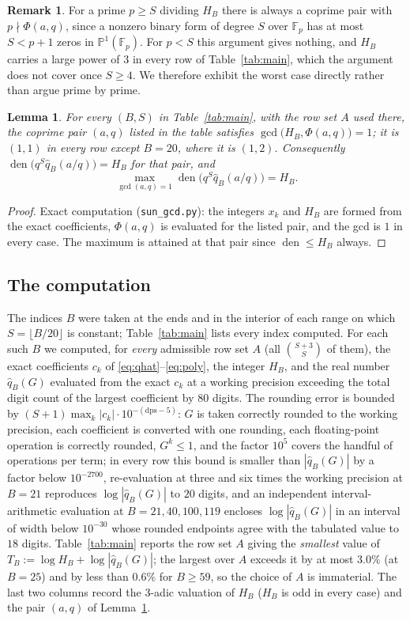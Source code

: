 \documentclass[11pt]{amsart}
\newtheorem{lemma}[theorem]{Lemma}
\theoremstyle{definition}
\newtheorem{remark}[theorem]{Remark}
\newcommand{\Fp}{\mathbb{F}_p}
\newcommand{\qhat}{\widehat{q}}
\DeclareMathOperator{\den}{den}
\begin{document}
\begin{remark}
For a prime $p\ge S$ dividing $H_B$ there is always a coprime pair with $p\nmid\Phi(a,q)$, since a nonzero binary
form of degree $S$ over $\Fp$ has at most $S<p+1$ zeros in $\mathbb P^1(\Fp)$. For $p<S$ this argument gives nothing, and $H_B$ carries a large power of $3$ in every row of Table~\ref{tab:main}, which the argument does not cover once $S\ge4$. We therefore exhibit the
worst case directly rather than argue prime by prime.
\end{remark}

\begin{lemma}\label{lem:cert}
For every $(B,S)$ in Table~\ref{tab:main}, with the row set $A$ used there, the coprime pair $(a,q)$ listed in the table satisfies $\gcd\bigl(H_B,\Phi(a,q)\bigr)=1$; it is $(1,1)$ in every row except $B=20$, where it is $(1,2)$. Consequently $\den\bigl(q^S\qhat_B(a/q)\bigr)=H_B$ for that pair, and
\[
\max_{\gcd(a,q)=1}\den\bigl(q^S\qhat_B(a/q)\bigr)=H_B .
\]
\end{lemma}

\begin{proof}
Exact computation (\texttt{sun\_gcd.py}): the integers $x_k$ and $H_B$ are formed from the exact coefficients,
$\Phi(a,q)$ is evaluated for the listed pair, and the gcd is $1$ in every case. The maximum is attained at that pair since $\den\le H_B$ always.
\end{proof}

\subsection{The computation}\label{sec:computation}
The indices $B$ were taken at the ends and in the interior of each range on which $S=\lfloor B/20\rfloor$ is constant; Table~\ref{tab:main} lists every index computed. For each such $B$ we computed, for \emph{every} admissible row set $A$
(all $\binom{S+3}{S}$ of them), the exact coefficients $c_k$ of
\eqref{eq:qhat}--\eqref{eq:poly}, the integer $H_B$, and the real number $\qhat_B(G)$ evaluated from the exact
$c_k$ at a working precision exceeding the total digit count of the largest coefficient by $80$ digits. The
rounding error is bounded by $(S{+}1)\max_k|c_k|\cdot10^{-(\mathrm{dps}-5)}$: $G$ is taken correctly rounded to
the working precision, each coefficient is converted with one rounding, each floating-point operation is
correctly rounded, $G^k\le1$, and the factor $10^5$ covers the handful of operations per term; in every row this bound is smaller than $|\qhat_B(G)|$ by a factor below $10^{-2700}$, re-evaluation at three and six times the working precision at $B=21$ reproduces $\log|\qhat_B(G)|$ to $20$ digits, and an independent interval-arithmetic evaluation at $B=21,40,100,119$
encloses $\log|\qhat_B(G)|$ in an interval of width below $10^{-30}$ whose rounded endpoints agree with the tabulated value to $18$ digits. Table~\ref{tab:main} reports the row set $A$ giving the
\emph{smallest} value of $T_B:=\log H_B+\log|\qhat_B(G)|$; the largest over $A$ exceeds it by at most $3.0\%$ (at $B=25$) and by less than $0.6\%$ for $B\ge59$, so the choice of $A$ is immaterial.
The last two columns record the $3$-adic valuation of $H_B$ ($H_B$ is odd in every case) and the pair $(a,q)$ of Lemma~\ref{lem:cert}.
\end{document}
